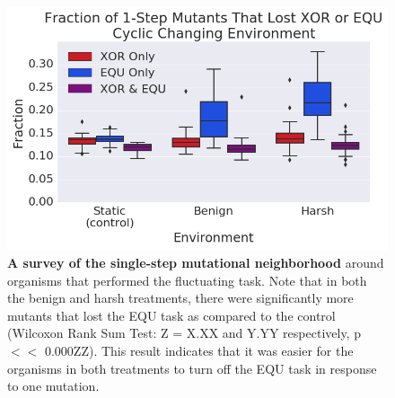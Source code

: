 \documentclass[PhD]{msu-thesis}
\begin{document}
	\begin{figure}[!h] %
	\includegraphics[trim={0.2cm 0 0 0.2cm},clip,width=0.75\columnwidth]{figures/CE/CCE_frac_1step__box.png}
	\caption{\textbf{A survey of the single-step mutational neighborhood} around organisms that performed the fluctuating task. Note that in both the benign and harsh treatments, there were significantly more mutants that lost the EQU task as compared to the control (Wilcoxon Rank Sum Test: Z = X.XX and Y.YY respectively, p $<<$ 0.000ZZ). This result indicates that it was easier for the organisms in both treatments to turn off the EQU task in response to one mutation. 
	}\label{fig:CCE_single_step}

	\end{figure}
\end{document}
